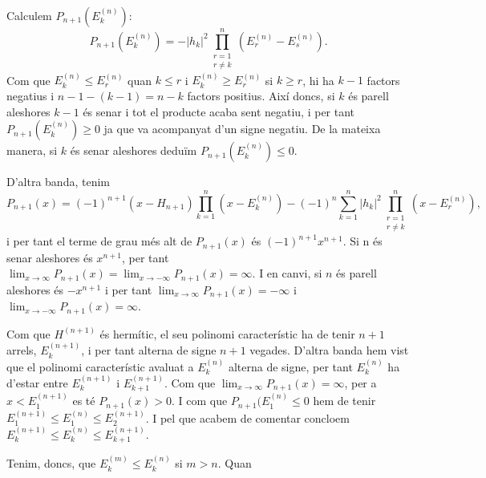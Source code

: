 \documentclass[12pt]{article}
\numberwithin{table}{section}
\numberwithin{figure}{section}
\numberwithin{equation}{section}
\newcommand{\abs}[1]{\lvert #1 \rvert}
\begin{document}
Calculem \( P_{n+1}(E_k^{(n)}) \):
\begin{equation*}
	P_{n+1}(E_k^{(n)}) = -\abs{h_k}^2 \prod_{\substack{r = 1 \\ r \neq k}}^n (E_r^{(n)} - E_s^{(n)}).
\end{equation*}
Com que \( E_k^{(n)} \leq E_r^{(n)} \) quan \( k \leq r \) i \( E_k^{(n)} \geq E_r^{(n)} \) si \( k \geq r \), hi ha \( k - 1 \) factors negatius i \( n - 1 - (k-1) = n - k \) factors positius. Així doncs, si \( k \) és parell aleshores \( k-1 \) és senar i tot el producte acaba sent negatiu, i per tant \( P_{n+1}(E_k^{(n)}) \geq 0 \) ja que va acompanyat d'un signe negatiu. De la mateixa manera, si \( k \) és senar aleshores deduïm \( P_{n+1}(E_k^{(n)}) \leq 0 \).

D'altra banda, tenim
\begin{equation*}
 	P_{n+1}(x) = (-1)^{n+1}(x - H_{n+1})\prod_{k = 1}^n(x - E_k^{(n)}) - (-1)^n \sum_{k = 1}^{n}\abs{h_k}^2 \prod_{\substack{r = 1 \\ r \neq k}}^n (x - E_r^{(n)}),
\end{equation*}
i per tant el terme de grau més alt de \( P_{n+1}(x) \) és \( (-1)^{n+1}x^{n+1} \). Si n és senar aleshores és \( x^{n+1} \), per tant \( \lim_{x \to \infty}P_{n+1}(x) = \lim_{x \to -\infty}P_{n+1}(x) = \infty \). I en canvi, si \( n \) és parell aleshores és \( -x^{n+1} \) i per tant \( \lim_{x \to \infty}P_{n+1}(x) = -\infty \) i \( \lim_{x \to -\infty}P_{n+1}(x) = \infty \). 

Com que \( H^{(n+1)} \) és hermític, el seu polinomi característic ha de tenir \( n+1 \) arrels, \( E_k^{(n+1)} \), i per tant alterna de signe \( n + 1 \) vegades. D'altra banda hem vist que el polinomi característic avaluat a \( E_k^{(n)} \) alterna de signe, per tant \( E_k^{(n)} \) ha d'estar entre \( E_k^{(n+1)} \) i \( E_{k+1}^{(n+1)} \). Com que \( \lim_{x \to \infty}P_{n+1}(x) = \infty \), per a \( x < E_1^{(n+1)} \) es té \( P_{n+1}(x) > 0 \). I com que \( P_{n+1}(E_1^{(n)} \leq 0 \) hem de tenir \( E_1^{(n+1)} \leq E_1^{(n)} \leq E_2^{(n+1)} \). I pel que acabem de comentar concloem \( E_k^{(n+1)} \leq E_k^{(n)} \leq E_{k+1}^{(n+1)} \).

Tenim, doncs, que \( E_k^{(m)} \leq E_k^{(n)} \) si \( m > n \). Quan 
\end{document}
